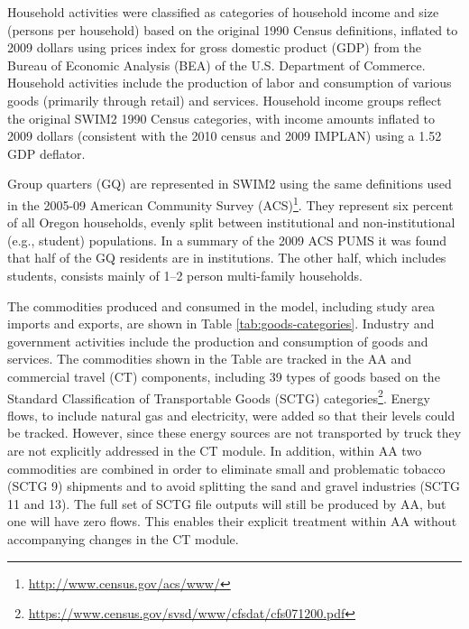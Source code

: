 Household activities were classified as categories of household income and size (persons per household) based on the original 1990 Census definitions, inflated to 2009 dollars using prices index for gross domestic product (GDP) from the Bureau of Economic Analysis (BEA) of the U.S. Department of Commerce. Household activities include the production of labor and consumption of various goods (primarily through retail) and services. Household income groups reflect the original SWIM2 1990 Census categories, with income amounts inflated to 2009 dollars (consistent with the 2010 census and 2009 IMPLAN) using a 1.52 GDP deflator.

Group quarters (GQ) are represented in SWIM2 using the same definitions used in the 2005-09 American Community Survey (ACS)\footnote{\url{http://www.census.gov/acs/www/}}. They represent six percent of all Oregon households, evenly split between institutional and non-institutional (e.g., student) populations. In a summary of the 2009 ACS PUMS it was found that half of the GQ residents are in institutions. The other half, which includes students, consists mainly of 1--2 person multi-family households.

The commodities produced and consumed in the model, including study area imports and exports, are shown in Table \ref{tab:goods-categories}. Industry and government activities include the production and consumption of goods and services. The commodities shown in the Table are tracked in the AA and commercial travel (CT) components, including 39 types of goods based on the Standard Classification of Transportable Goods (SCTG) categories\footnote{\url{https://www.census.gov/svsd/www/cfsdat/cfs071200.pdf}}. Energy flows, to include natural gas and electricity, were added so that their levels could be tracked. However, since these energy sources are not transported by truck they are not explicitly addressed in the CT module. In addition, within AA two commodities are combined in order to eliminate small and problematic tobacco (SCTG 9) shipments and to avoid splitting the sand and gravel industries (SCTG 11 and 13). The full set of SCTG file outputs will still be produced by AA, but one will have zero flows. This enables their explicit treatment within AA without accompanying changes in the CT module.

